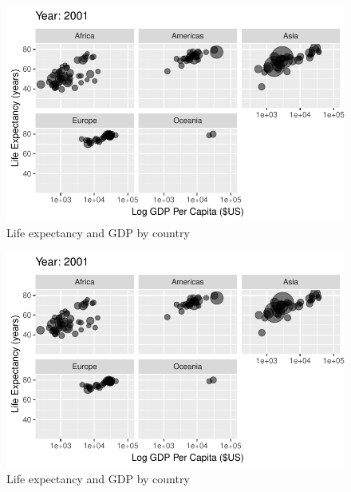 \documentclass[
  letterpaper,
  DIV=11,
  numbers=noendperiod]{scrreport}
\theoremstyle{definition}
\theoremstyle{remark}
\begin{document}
\begin{figure}

{\centering \includegraphics{index_files/figure-pdf/fig-anim-lifegdp-89.pdf}

}

\caption{\label{fig-anim-lifegdp-89}Life expectancy and GDP by country}

\end{figure}

\begin{figure}

{\centering \includegraphics{index_files/figure-pdf/fig-anim-lifegdp-90.pdf}

}

\caption{\label{fig-anim-lifegdp-90}Life expectancy and GDP by country}

\end{figure}
\end{document}
